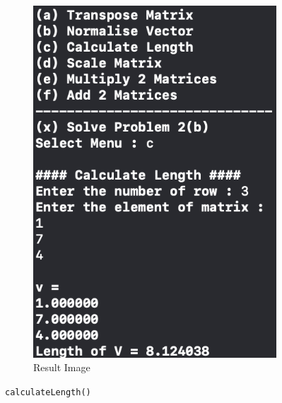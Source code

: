 \begin{figure}[h]
\begin{subfigure}[b]{0.45\textwidth}
        \includegraphics[width=\textwidth]{img/prj0/c.png}
        \caption{Result Image}
        \label{fig:image}
    \end{subfigure}
    \caption{\texttt{calculateLength()}}
\end{figure}
\pagebreak

